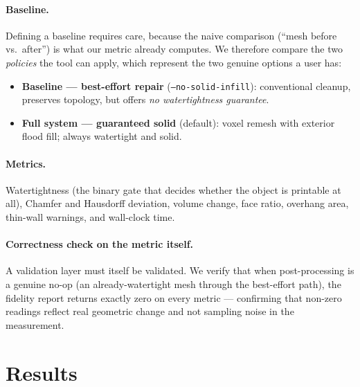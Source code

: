 \documentclass[11pt,a4paper]{article}
\begin{document}
\paragraph{Baseline.} Defining a baseline requires care, because the naive
comparison (``mesh before vs.\ after'') is what our metric already computes. We
therefore compare the two \emph{policies} the tool can apply, which represent
the two genuine options a user has:

\begin{itemize}[leftmargin=*]
  \item \textbf{Baseline --- best-effort repair} (\texttt{--no-solid-infill}):
        conventional cleanup, preserves topology, but offers \emph{no
        watertightness guarantee}.
  \item \textbf{Full system --- guaranteed solid} (default): voxel remesh with
        exterior flood fill; always watertight and solid.
\end{itemize}

\paragraph{Metrics.} Watertightness (the binary gate that decides whether the
object is printable at all), Chamfer and Hausdorff deviation, volume change,
face ratio, overhang area, thin-wall warnings, and wall-clock time.

\paragraph{Correctness check on the metric itself.} A validation layer must
itself be validated. We verify that when post-processing is a genuine no-op
(an already-watertight mesh through the best-effort path), the fidelity report
returns exactly zero on every metric --- confirming that non-zero readings
reflect real geometric change and not sampling noise in the measurement.

\section{Results}
\end{document}
